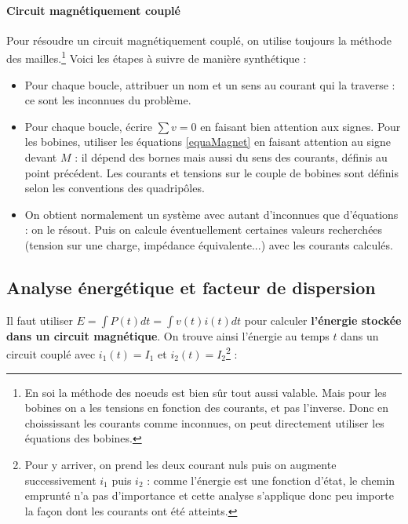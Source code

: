 \paragraph{Circuit magnétiquement couplé} Pour résoudre un circuit magnétiquement couplé, on utilise toujours la méthode des mailles.\footnote{En soi la méthode des noeuds est bien sûr tout aussi valable. Mais pour les bobines on a les tensions en fonction des courants, et pas l'inverse. Donc en choississant les courants comme inconnues, on peut directement utiliser les équations des bobines.} %
Voici les étapes à suivre de manière synthétique :
\begin{itemize}
\item Pour chaque boucle, attribuer un nom et un sens au courant qui la traverse : ce sont les inconnues du problème.
\item Pour chaque boucle, écrire $\sum v = 0$ en faisant bien attention aux signes. Pour les bobines, utiliser les équations \ref{equaMagnet} en faisant attention au signe devant $M$ : il dépend des bornes mais aussi du sens des courants, définis au point précédent. Les courants et tensions sur le couple de bobines sont définis selon les conventions des quadripôles.
\item On obtient normalement un système avec autant d'inconnues que d'équations : on le résout. Puis on calcule éventuellement certaines valeurs recherchées (tension sur une charge, impédance équivalente...) avec les courants calculés.
\end{itemize}

\subsection{Analyse énergétique et facteur de dispersion}
Il faut utiliser $E = \int P(t)dt = \int v(t)i(t) dt$ pour calculer \textbf{l'énergie stockée dans un circuit magnétique}. On trouve ainsi l'énergie au temps $t$ dans un circuit couplé avec $i_1(t) = I_1$ et $i_2(t) = I_2$\footnote{Pour y arriver, on prend les deux courant nuls puis on augmente successivement $i_1$ puis $i_2$ : comme l'énergie est une fonction d'état, le chemin emprunté n'a pas d'importance et cette analyse s'applique donc peu importe la façon dont les courants ont été atteints.} :

